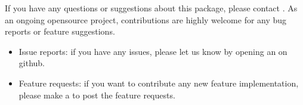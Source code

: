 \documentclass[letterpaper,10pt,english]{sphinxmanual}
\begin{document}
\sphinxAtStartPar
If you have any questions or suggestions about this package, please contact .
As an ongoing open\sphinxhyphen{}source project, contributions are highly welcome for any bug reports or
feature suggestions.
\begin{itemize}
\item {} 
\sphinxAtStartPar
Issue reports: if you have any issues, please let us know by opening an 
on github.

\item {} 
\sphinxAtStartPar
Feature requests: if you want to contribute any new feature implementation, please make a
 to post the feature requests.

\end{itemize}


\renewcommand{\indexname}{Python Module Index}
\begin{sphinxtheindex}
\let\bigletter\sphinxstyleindexlettergroup
\bigletter{p}
\item\relax{}
\item\relax{}
\item\relax{}
\end{sphinxtheindex}

\renewcommand{\indexname}{Index}
\printindex
\end{document}
